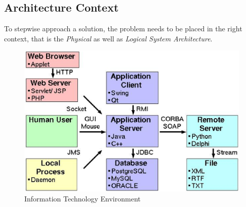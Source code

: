%
%
%
%
%
%
%

\subsection{Architecture Context}
\label{architecture_context_heading}

To stepwise approach a solution, the problem needs to be placed in the right
context, that is the \emph{Physical} as well as \emph{Logical System Architecture}.

\begin{figure}[ht]
    \begin{center}
        \includegraphics[scale=0.3]{vector/information_technology_environment.eps}
        \caption{Information Technology Environment}
        \label{information_technology_environment_figure}
    \end{center}
\end{figure}

